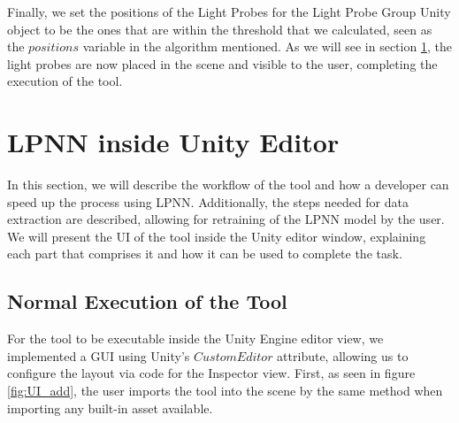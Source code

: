 Finally, we set the positions of the Light Probes for the Light Probe Group Unity object to be the ones that are within the threshold that we calculated, seen as the $positions$ variable in the algorithm mentioned. As we will see in section \ref{sec:LPNN_UI}, the light probes are now placed in the scene and visible to the user, completing the execution of the tool.

\section{LPNN inside Unity Editor}
\label{sec:LPNN_UI}

In this section, we will describe the workflow of the tool and how a developer can speed up the process using LPNN. Additionally, the steps needed for data extraction are described, allowing for retraining of the LPNN model by the user. We will present the UI of the tool inside the Unity editor window, explaining each part that comprises it and how it can be used to complete the task.

\subsection{Normal Execution of the Tool}
\label{sec:LPNN_UI:normal}

For the tool to be executable inside the Unity Engine editor view, we implemented a GUI using Unity's $CustomEditor$ attribute, allowing us to configure the layout via code for the Inspector view. First, as seen in figure \ref{fig:UI_add}, the user imports the tool into the scene by the same method when importing any built-in asset available.

